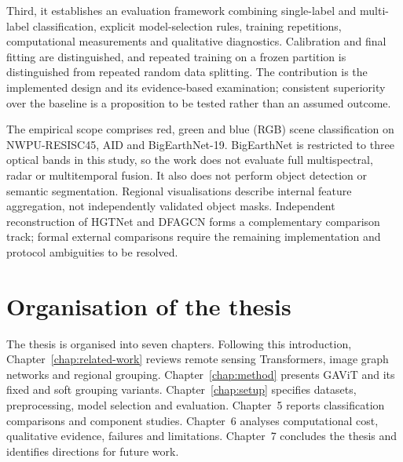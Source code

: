 Third, it establishes an evaluation framework combining single-label and
multi-label classification, explicit model-selection rules, training
repetitions, computational measurements and qualitative diagnostics.
Calibration and final fitting are distinguished, and repeated training on
a frozen partition is distinguished from repeated random data splitting.
The contribution is the implemented design and its evidence-based
examination; consistent superiority over the baseline is a proposition to
be tested rather than an assumed outcome.

The empirical scope comprises red, green and blue (RGB) scene classification on NWPU-RESISC45,
AID and BigEarthNet-19. BigEarthNet is restricted to three optical bands in
this study, so the work does not evaluate full multispectral, radar or
multitemporal fusion. It also does not perform object detection or semantic
segmentation. Regional visualisations describe internal feature aggregation,
not independently validated object masks. Independent reconstruction of
HGTNet and DFAGCN forms a complementary comparison track; formal external
comparisons require the remaining implementation and protocol ambiguities
to be resolved.

\section{Organisation of the thesis}

The thesis is organised into seven chapters. Following this introduction,
Chapter~\ref{chap:related-work} reviews remote sensing Transformers, image graph networks and
regional grouping. Chapter~\ref{chap:method} presents GAViT and its fixed and
soft grouping variants. Chapter~\ref{chap:setup} specifies datasets,
preprocessing, model selection and evaluation. Chapter~5 reports
classification comparisons and component studies. Chapter~6 analyses
computational cost, qualitative evidence, failures and limitations.
Chapter~7 concludes the thesis and identifies directions for future work.

